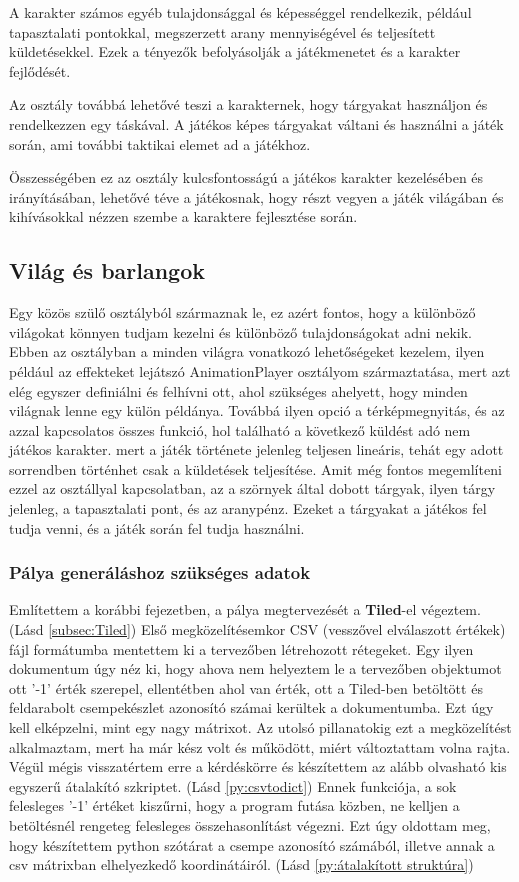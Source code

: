 A karakter számos egyéb tulajdonsággal és képességgel rendelkezik, például tapasztalati pontokkal, megszerzett arany mennyiségével és teljesített küldetésekkel. Ezek a tényezők befolyásolják a játékmenetet és a karakter fejlődését.

Az osztály továbbá lehetővé teszi a karakternek, hogy tárgyakat használjon és rendelkezzen egy táskával. A játékos képes tárgyakat váltani és használni a játék során, ami további taktikai elemet ad a játékhoz.

Összességében ez az osztály kulcsfontosságú a játékos karakter kezelésében és irányításában, lehetővé téve a játékosnak, hogy részt vegyen a játék világában és kihívásokkal nézzen szembe a karaktere fejlesztése során.
\subsection{Világ és barlangok}

\indent \indent Egy közös szülő osztályból származnak le, ez azért fontos, hogy a különböző világokat könnyen tudjam kezelni és különböző tulajdonságokat adni nekik. Ebben az osztályban a minden világra vonatkozó lehetőségeket kezelem, ilyen például az effekteket lejátszó AnimationPlayer osztályom származtatása, mert azt elég egyszer definiálni és felhívni ott, ahol szükséges ahelyett, hogy minden világnak lenne egy külön példánya. Továbbá ilyen opció a térképmegnyitás, és az azzal kapcsolatos összes funkció, hol található a következő küldést adó nem játékos karakter. mert a játék története jelenleg teljesen lineáris, tehát egy adott sorrendben történhet csak a küldetések teljesítése. Amit még fontos megemlíteni ezzel az osztállyal kapcsolatban, az a szörnyek által dobott tárgyak, ilyen tárgy jelenleg, a tapasztalati pont, és az aranypénz. Ezeket a tárgyakat a játékos fel tudja venni, és a játék során fel tudja használni.  

\subsubsection{Pálya generáláshoz szükséges adatok}

\indent \indent Említettem a korábbi fejezetben, a pálya megtervezését a \textbf{Tiled}-el végeztem. (Lásd \ref{subsec:Tiled}) 
Első megközelítésemkor CSV (vesszővel elválaszott értékek) fájl formátumba mentettem ki a tervezőben létrehozott rétegeket. Egy ilyen dokumentum úgy néz ki, hogy ahova nem helyeztem le a tervezőben objektumot ott '-1' érték szerepel, ellentétben ahol van érték, ott a Tiled-ben betöltött és feldarabolt csempekészlet azonosító számai kerültek a dokumentumba. Ezt úgy kell elképzelni, mint egy nagy mátrixot. Az utolsó pillanatokig ezt a megközelítést alkalmaztam, mert ha már kész volt és működött, miért változtattam volna rajta. Végül mégis visszatértem erre a kérdéskörre és készítettem az alább olvasható kis egyszerű átalakító szkriptet. (Lásd \ref{py:csvtodict}) Ennek funkciója, a sok felesleges '-1' értéket kiszűrni, hogy a program futása közben, ne kelljen a betöltésnél rengeteg felesleges összehasonlítást végezni. Ezt úgy oldottam meg, hogy készítettem python szótárat a csempe azonosító számából, illetve annak a csv mátrixban elhelyezkedő koordinátáiról. (Lásd \ref{py:átalakított struktúra})


